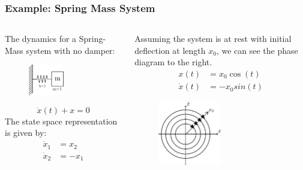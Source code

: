 \documentclass[11pt,handout]{beamer}   %
\begin{document}
\begin{frame}
\frametitle{Example: Spring Mass System}
   \begin{columns}
   \begin{column}{0.5\textwidth}
The dynamics for a Spring-Mass system with no damper:
       \begin{figure}
       \includegraphics[width=0.5\textwidth]{Figures/Spring_Mass.png}
       \end{figure}
\begin{equation}
\ddot{x}(t) + x = 0
\end{equation}
The state space representation is given by:
\begin{equation}
\begin{aligned}
\dot{x}_1 &= x_2\\
\dot{x}_2 &= -x_1
\end{aligned}
\end{equation}
\end{column}
   \begin{column}{0.5\textwidth}  %
       Assuming the system is at rest with initial deflection at length $x_0$, we can see the phase diagram to the right.
\begin{equation}
\begin{aligned}
x(t) &= x_0 \cos (t)\\
\dot{x}(t) &= -x_0 sin(t)
\end{aligned}
\end{equation}
       \begin{center}
       \begin{figure}
       \includegraphics[width=0.5\textwidth]{Figures/Spring_Mass_Phase.png}
       \end{figure}
        \end{center}
   \end{column}
  \end{columns}
\end{frame}
\end{document}
